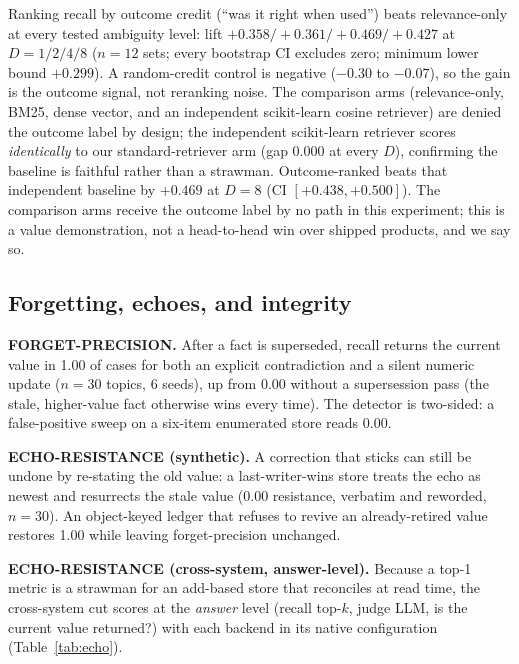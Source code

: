 \documentclass[11pt]{article}
\begin{document}
Ranking recall by outcome credit (``was it right when used'') beats relevance-only at every tested
ambiguity level: lift $+0.358/+0.361/+0.469/+0.427$ at $D{=}1/2/4/8$ ($n{=}12$ sets; every bootstrap CI
excludes zero; minimum lower bound $+0.299$). A random-credit control is negative ($-0.30$ to
$-0.07$), so the gain is the outcome signal, not reranking noise. The comparison arms (relevance-only,
BM25, dense vector, and an independent scikit-learn cosine retriever) are denied the outcome label by
design; the independent scikit-learn retriever scores \emph{identically} to our standard-retriever arm
(gap 0.000 at every $D$), confirming the baseline is faithful rather than a strawman. Outcome-ranked
beats that independent baseline by $+0.469$ at $D{=}8$ (CI $[+0.438,+0.500]$). The comparison arms
receive the outcome label by no path in this experiment; this is a value demonstration, not a
head-to-head win over shipped products, and we say so.

\subsection{Forgetting, echoes, and integrity}
\label{sec:echo}

\textbf{FORGET-PRECISION.} After a fact is superseded, recall returns the current value in 1.00 of
cases for both an explicit contradiction and a silent numeric update ($n{=}30$ topics, 6 seeds), up
from 0.00 without a supersession pass (the stale, higher-value fact otherwise wins every time). The
detector is two-sided: a false-positive sweep on a six-item enumerated store reads 0.00.

\textbf{ECHO-RESISTANCE (synthetic).} A correction that sticks can still be undone by re-stating the
old value: a last-writer-wins store treats the echo as newest and resurrects the stale value
(0.00 resistance, verbatim and reworded, $n{=}30$). An object-keyed ledger that refuses to revive an
already-retired value restores 1.00 while leaving forget-precision unchanged.

\textbf{ECHO-RESISTANCE (cross-system, answer-level).} Because a top-1 metric is a strawman for an
add-based store that reconciles at read time, the cross-system cut scores at the \emph{answer} level
(recall top-$k$, judge LLM, is the current value returned?) with each backend in its native
configuration (Table~\ref{tab:echo}).
\end{document}
